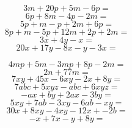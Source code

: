 \documentclass[11pt]{article}
\begin{document}
\begin{multicols}{2}
    
\begin{equation}
3m + 20p + 5m - 6p = 
\end{equation}
\begin{equation}
6p + 8m - 4p - 2m = 
\end{equation}
\begin{equation}
5p + m -p +2m + 6p =
\end{equation}
\begin{equation}
8p + m -5p + 12m + 2p + 2m =
\end{equation}
\begin{equation}
3x + 4y - x = 
\end{equation}
\begin{equation}
20x + 17y - 8x - y -3x =
\end{equation}

\end{multicols}
\newpage
\begin{multicols}{2}

\begin{equation}
4mp + 5m -3mp +8p - 2m =
\end{equation}
\begin{equation}
2n + 77m =
\end{equation}
\begin{equation}
7xy + 45x -6xy - 2x + 8y = 
\end{equation}
\begin{equation}
7abc + 5xyz - abc + 6xyz = 
\end{equation}
\begin{equation}
-ax + by + 2ax - 3by = 
\end{equation}
\begin{equation}
5xy + 7ab - 3xy -6ab - xy = 
\end{equation}
\begin{equation}
30x + 8xy - 4xy - 12x + -2b =
\end{equation}
\begin{equation}
-x + 7x -y + 8y = 
\end{equation}


\end{multicols}

    
\end{document}
